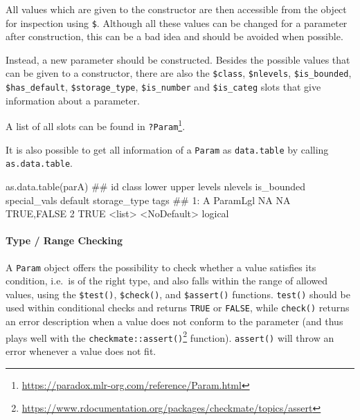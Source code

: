 \documentclass[12pt,]{scrbook}
\newenvironment{Shaded}{}{}
\newcommand{\KeywordTok}[1]{\textcolor[rgb]{0.00,0.00,1.00}{#1}}
\newcommand{\NormalTok}[1]{#1}
\newcommand{\OperatorTok}[1]{#1}
\let\oldparagraph\paragraph
\renewcommand{\paragraph}[1]{\oldparagraph{#1}\mbox{}}
\renewcommand{\href}[2]{#2\footnote{\url{#1}}}
\begin{document}
All values which are given to the constructor are then accessible from the object for inspection using \texttt{\$}.
Although all these values can be changed for a parameter after construction, this can be a bad idea and should be avoided when possible.

Instead, a new parameter should be constructed.
Besides the possible values that can be given to a constructor, there are also the \texttt{\$class}, \texttt{\$nlevels}, \texttt{\$is\_bounded}, \texttt{\$has\_default}, \texttt{\$storage\_type}, \texttt{\$is\_number} and \texttt{\$is\_categ} slots that give information about a parameter.

A list of all slots can be found in \href{https://paradox.mlr-org.com/reference/Param.html}{\texttt{?Param}}.

\begin{Shaded}
\end{Shaded}

It is also possible to get all information of a \texttt{Param} as \texttt{data.table} by calling \texttt{as.data.table}.

\begin{Shaded}
\begin{Highlighting}[]
\KeywordTok{as.data.table}\NormalTok{(parA)}
\NormalTok{##    id    class lower upper      levels nlevels is_bounded special_vals     default storage_type tags}
\NormalTok{## 1:  A ParamLgl    NA    NA  TRUE,FALSE       2       TRUE       <list> <NoDefault>      logical}
\end{Highlighting}
\end{Shaded}

\hypertarget{type-range-checking}{%
\paragraph{Type / Range Checking}\label{type-range-checking}}

A \texttt{Param} object offers the possibility to check whether a value satisfies its condition, i.e.~is of the right type, and also falls within the range of allowed values, using the \texttt{\$test()}, \texttt{\$check()}, and \texttt{\$assert()} functions.
\texttt{test()} should be used within conditional checks and returns \texttt{TRUE} or \texttt{FALSE}, while \texttt{check()} returns an error description when a value does not conform to the parameter (and thus plays well with the \href{https://www.rdocumentation.org/packages/checkmate/topics/assert}{\texttt{checkmate::assert()}} function).
\texttt{assert()} will throw an error whenever a value does not fit.
\end{document}
